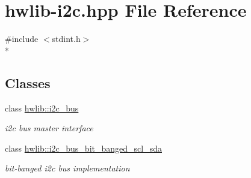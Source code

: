 \hypertarget{hwlib-i2c_8hpp}{}\section{hwlib-\/i2c.hpp File Reference}
\label{hwlib-i2c_8hpp}
{\ttfamily \#include $<$stdint.\+h$>$}\\*
\subsection*{Classes}
\begin{DoxyCompactItemize}
\item 
class \hyperlink{classhwlib_1_1i2c__bus}{hwlib\+::i2c\+\_\+bus}
\begin{DoxyCompactList}\small\item\em i2c bus master interface \end{DoxyCompactList}\item 
class \hyperlink{classhwlib_1_1i2c__bus__bit__banged__scl__sda}{hwlib\+::i2c\+\_\+bus\+\_\+bit\+\_\+banged\+\_\+scl\+\_\+sda}
\begin{DoxyCompactList}\small\item\em bit-\/banged i2c bus implementation \end{DoxyCompactList}\end{DoxyCompactItemize}
